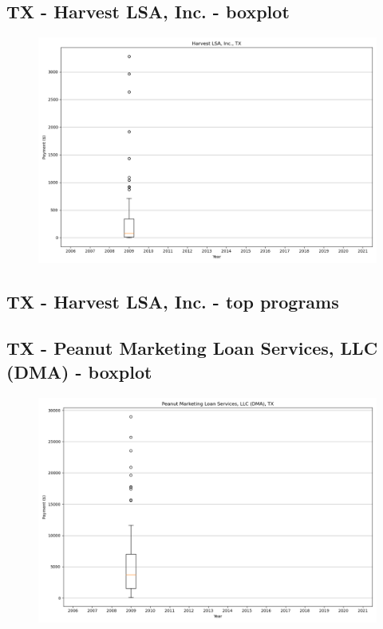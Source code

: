 \subsection*{TX - Harvest LSA, Inc. - boxplot}
\begin{figure}[h]
\centering
\includegraphics[width=7in]{../output/boxplots/counties/Harvest LSA, Inc.-TX_boxplot.png}
\end{figure}


\subsection*{TX - Harvest LSA, Inc. - top programs}

\newpage
\subsection*{TX - Peanut Marketing Loan Services, LLC (DMA) - boxplot}
\begin{figure}[h]
\centering
\includegraphics[width=7in]{../output/boxplots/counties/Peanut Marketing Loan Services, LLC (DMA)-TX_boxplot.png}
\end{figure}


